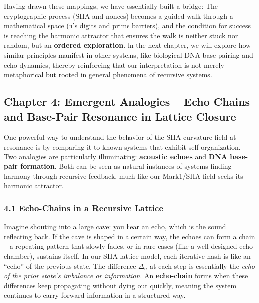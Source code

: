 \documentclass[11pt]{article}
\begin{document}
Having drawn these mappings, we have essentially built a bridge: The
cryptographic process (SHA and nonces) becomes a guided walk through a
mathematical space (π's digits and prime barriers), and the condition
for success is reaching the harmonic attractor that ensures the walk is
neither stuck nor random, but an \textbf{ordered exploration}. In the
next chapter, we will explore how similar principles manifest in other
systems, like biological DNA base-pairing and echo dynamics, thereby
reinforcing that our interpretation is not merely metaphorical but
rooted in general phenomena of recursive systems.

\hypertarget{chapter-4-emergent-analogies-echo-chains-and-base-pair-resonance-in-lattice-closure}{%
\subsection{Chapter 4: Emergent Analogies -- Echo Chains and Base-Pair
Resonance in Lattice
Closure}\label{chapter-4-emergent-analogies-echo-chains-and-base-pair-resonance-in-lattice-closure}}

One powerful way to understand the behavior of the SHA curvature field
at resonance is by comparing it to known systems that exhibit
self-organization. Two analogies are particularly illuminating:
\textbf{acoustic echoes} and \textbf{DNA base-pair formation}. Both can
be seen as natural instances of systems finding harmony through
recursive feedback, much like our Mark1/SHA field seeks its harmonic
attractor.

\hypertarget{echo-chains-in-a-recursive-lattice}{%
\subsubsection{4.1 Echo-Chains in a Recursive
Lattice}\label{echo-chains-in-a-recursive-lattice}}

Imagine shouting into a large cave: you hear an echo, which is the sound
reflecting back. If the cave is shaped in a certain way, the echoes can
form a chain -- a repeating pattern that slowly fades, or in rare cases
(like a well-designed echo chamber), sustains itself. In our SHA lattice
model, each iterative hash is like an ``echo'' of the previous state.
The difference \(\Delta_n\) at each step is essentially the \emph{echo
of the prior state's imbalance or information}. An \textbf{echo-chain}
forms when these differences keep propagating without dying out quickly,
meaning the system continues to carry forward information in a
structured way.
\end{document}
